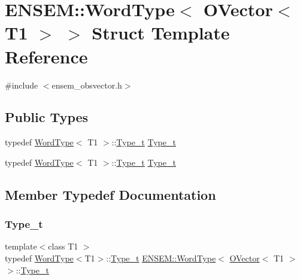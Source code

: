 \hypertarget{structENSEM_1_1WordType_3_01OVector_3_01T1_01_4_01_4}{}\section{E\+N\+S\+EM\+:\+:Word\+Type$<$ O\+Vector$<$ T1 $>$ $>$ Struct Template Reference}
\label{structENSEM_1_1WordType_3_01OVector_3_01T1_01_4_01_4}


{\ttfamily \#include $<$ensem\+\_\+obsvector.\+h$>$}

\subsection*{Public Types}
\begin{DoxyCompactItemize}
\item 
typedef \mbox{\hyperlink{structENSEM_1_1WordType}{Word\+Type}}$<$ T1 $>$\+::\mbox{\hyperlink{structENSEM_1_1WordType_3_01OVector_3_01T1_01_4_01_4_ab09c111517a85cf22c58611d96219000}{Type\+\_\+t}} \mbox{\hyperlink{structENSEM_1_1WordType_3_01OVector_3_01T1_01_4_01_4_ab09c111517a85cf22c58611d96219000}{Type\+\_\+t}}
\item 
typedef \mbox{\hyperlink{structENSEM_1_1WordType}{Word\+Type}}$<$ T1 $>$\+::\mbox{\hyperlink{structENSEM_1_1WordType_3_01OVector_3_01T1_01_4_01_4_ab09c111517a85cf22c58611d96219000}{Type\+\_\+t}} \mbox{\hyperlink{structENSEM_1_1WordType_3_01OVector_3_01T1_01_4_01_4_ab09c111517a85cf22c58611d96219000}{Type\+\_\+t}}
\end{DoxyCompactItemize}


\subsection{Member Typedef Documentation}
\mbox{\label{structENSEM_1_1WordType_3_01OVector_3_01T1_01_4_01_4_ab09c111517a85cf22c58611d96219000}} 
\subsubsection{\texorpdfstring{Type\_t}{Type\_t}\hspace{0.1cm}{\footnotesize\ttfamily [1/2]}}
{\footnotesize\ttfamily template$<$class T1 $>$ \\
typedef \mbox{\hyperlink{structENSEM_1_1WordType}{Word\+Type}}$<$T1$>$\+::\mbox{\hyperlink{structENSEM_1_1WordType_3_01OVector_3_01T1_01_4_01_4_ab09c111517a85cf22c58611d96219000}{Type\+\_\+t}} \mbox{\hyperlink{structENSEM_1_1WordType}{E\+N\+S\+E\+M\+::\+Word\+Type}}$<$ \mbox{\hyperlink{classENSEM_1_1OVector}{O\+Vector}}$<$ T1 $>$ $>$\+::\mbox{\hyperlink{structENSEM_1_1WordType_3_01OVector_3_01T1_01_4_01_4_ab09c111517a85cf22c58611d96219000}{Type\+\_\+t}}}

